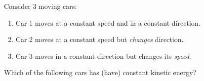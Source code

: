 \documentclass[12pt]{exam}
\begin{document}
\begin{questions}

\question Consider 3 moving cars:
	\begin{enumerate}
		\item Car 1 moves at a constant speed and in a constant direction.
		\item Car 2 moves at a constant speed but \textit{changes} direction.
		\item Car 3 moves in a constant direction but changes its \textit{speed}.
	\end{enumerate}
Which of the following cars has (have) constant kinetic energy?
\end{questions}
\end{document}
